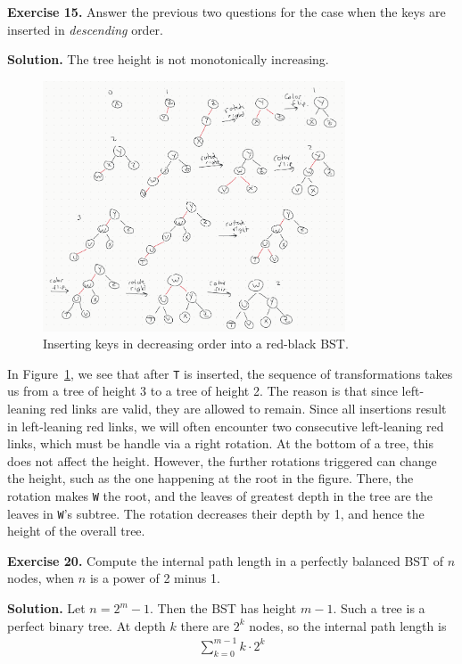 \documentclass[12pt, a4paper]{article}
\newenvironment{ex}[2][Exercise]
{\par\medskip\noindent \textbf{#1 #2.}}
{\medskip}
\newenvironment{sol}[1][Solution]
{\par\medskip\noindent \textbf{#1.} }
{\medskip}
\begin{document}
	\begin{ex}{15}
		Answer the previous two questions for the case when the keys are inserted in \emph{descending}
		order.
	\end{ex}
	\begin{sol}
		The tree height is not monotonically increasing.
		\begin{figure}
			\centering
			\includegraphics[width=0.8\textwidth]{exercise-15}
			\caption{Inserting keys in decreasing order into a red-black BST.}
			\label{fig:ex-15}
		\end{figure}
		In Figure~\ref{fig:ex-15}, we see that after \texttt{T} is inserted, the sequence
		of transformations takes us from a tree of height 3 to a tree of height 2. The
		reason is that since left-leaning red links are valid, they are allowed to remain.
		Since all insertions result in left-leaning red links, we will often encounter two
		consecutive left-leaning red links, which must be handle via a right rotation.
		At the bottom of a tree, this does not affect the height. However, the further
		rotations triggered can change the height, such as the one happening at the
		root in the figure. There, the rotation makes \texttt{W} the root, and the
		leaves of greatest depth in the tree are the leaves in \texttt{W}'s subtree.
		The rotation decreases their depth by 1, and hence the height of the
		overall tree.
	\end{sol}
	\begin{ex}{20}
		Compute the internal path length in a perfectly balanced BST of $n$ nodes, when
		$n$ is a power of 2 minus 1.
	\end{ex}
	\begin{sol}
		Let $n=2^m-1$. Then the BST has height $m-1$. Such a tree is a perfect binary tree.
		At depth $k$ there are $2^k$ nodes, so the internal path length is
		\begin{align*}
			\sum_{k=0}^{m-1}k\cdot 2^k
		\end{align*}
	\end{sol}
\end{document}
